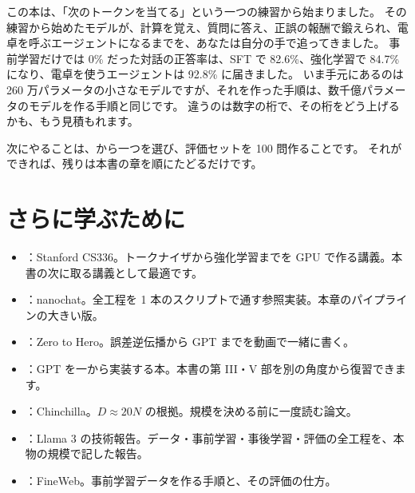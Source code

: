 この本は、「次のトークンを当てる」という一つの練習から始まりました。
その練習から始めたモデルが、計算を覚え、質問に答え、正誤の報酬で鍛えられ、電卓を呼ぶエージェントになるまでを、あなたは自分の手で追ってきました。
事前学習だけでは 0\% だった対話の正答率は、SFT で 82.6\%、強化学習で 84.7\% になり、電卓を使うエージェントは 92.8\% に届きました。
いま手元にあるのは 260 万パラメータの小さなモデルですが、それを作った手順は、数千億パラメータのモデルを作る手順と同じです。
違うのは数字の桁で、その桁をどう上げるかも、もう見積もれます。

次にやることは、から一つを選び、評価セットを 100 問作ることです。
それができれば、残りは本書の章を順にたどるだけです。

\section*{さらに学ぶために}
\begin{itemize}
\item \cite{cs336}：Stanford CS336。トークナイザから強化学習までを GPU で作る講義。本書の次に取る講義として最適です。
\item \cite{karpathy2025nanochat}：nanochat。全工程を 1 本のスクリプトで通す参照実装。本章のパイプラインの大きい版。
\item \cite{karpathy2022zerotohero}：Zero to Hero。誤差逆伝播から GPT までを動画で一緒に書く。
\item \cite{raschka2024build}：GPT を一から実装する本。本書の第 III・V 部を別の角度から復習できます。
\item \cite{hoffmann2022training}：Chinchilla。$D\approx20N$ の根拠。規模を決める前に一度読む論文。
\item \cite{dubey2024llama3}：Llama 3 の技術報告。データ・事前学習・事後学習・評価の全工程を、本物の規模で記した報告。
\item \cite{penedo2024fineweb}：FineWeb。事前学習データを作る手順と、その評価の仕方。
\end{itemize}

